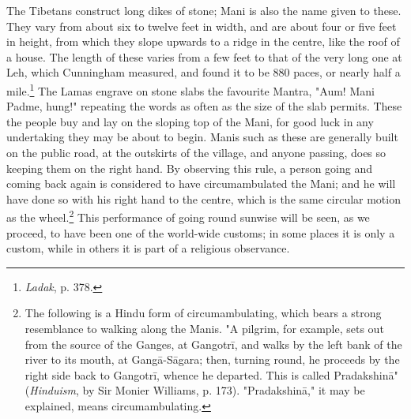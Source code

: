 \documentclass[a4paper, 11pt, oneside, polutonikogreek, english]{article}
\begin{document}
The Tibetans construct long dikes of stone; Mani is also the name given to these. They vary from about six to twelve feet in width, and are about four or five feet in height, from which they slope upwards to a ridge in the centre, like the roof of a house. The length of these varies from a few feet to that of the very long one at Leh, which Cunningham measured, and found it to be 880 paces, or nearly half a mile.\footnote{\emph{Ladak}, p. 378.} The Lamas engrave on stone slabs the favourite Mantra, "Aum! Mani Padme, hung!" repeating the words as often as the size of the slab permits. These the people buy and lay on the sloping top of the Mani, for good luck in any undertaking they may be about to begin. Manis such as these are generally built on the public road, at the outskirts of the village, and anyone passing, does so keeping them on the right hand. By observing this rule, a person going and coming back again is considered to have circumambulated the Mani; and he will have done so with his right hand to the centre, which is the same circular motion as the wheel.\footnote{The following is a Hindu form of circumambulating, which bears a strong resemblance to walking along the Manis. "A pilgrim, for example, sets out from the source of the Ganges, at Gangotrī, and walks by the left bank of the river to its mouth, at Gangā-Sāgara; then, turning round, he proceeds by the right side back to Gangotrī, whence he departed. This is called Pradakshinā" (\emph{Hinduism}, by Sir Monier Williams, p. 173). "Pradakshinā," it may be explained, means circumambulating.} This performance of going round sunwise will be seen, as we proceed, to have been one of the world-wide customs; in some places it is only a custom, while in others it is part of a religious observance.
\end{document}
